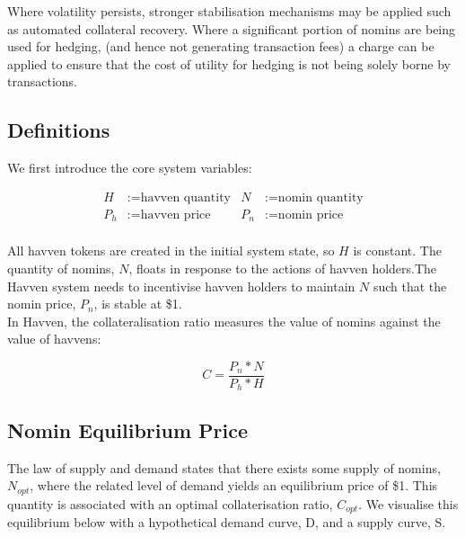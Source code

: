 \noindent Where volatility persists, stronger stabilisation mechanisms may be applied such as automated collateral recovery. Where a significant portion of nomins are being used for hedging, (and hence not generating transaction fees) a charge can be applied to ensure that the cost of utility for hedging is not being solely borne by transactions.

\newpage

\subsection{Definitions}

\noindent We first introduce the core system variables:

\begin{align*}
H &:= \text{havven quantity} & N &:= \text{nomin quantity} \\
P_h &:= \text{havven price}  & P_n &:= \text{nomin price} \\
\end{align*}


\noindent All havven tokens are created in the initial system state, so $H$ is constant. The quantity of nomins, $N$, floats in response to the actions of havven holders.The Havven system needs to incentivise havven holders to maintain $N$ such that the nomin price, $P_n$, is stable at \$1.\\

\noindent In Havven, the collateralisation ratio measures the value of nomins against the value of havvens:

\begin{equation}
C = \frac{P_n * N}{P_h * H} \label{eq:collateralisation}
\end{equation}

\subsection{Nomin Equilibrium Price} The law of supply and demand states that there exists some supply of nomins, $N_{opt}$, where the related level of demand yields an equilibrium price of \$1. This quantity is associated with an optimal collaterisation ratio, $C_{opt}$. We visualise this equilibrium below with a hypothetical demand curve, D, and a supply curve, S.  \\

